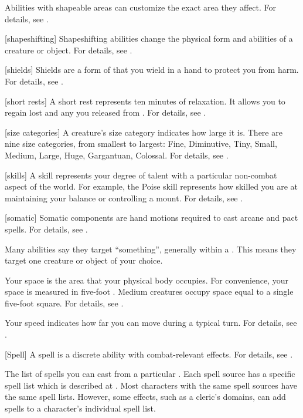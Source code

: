  Abilities with shapeable areas can customize the exact area they affect.
For details, see .

[shapeshifting] Shapeshifting abilities change the physical form and abilities of a creature or object.
For details, see .

[shields] Shields are a form of  that you wield in a hand to protect you from harm.
For details, see .

[short rests] A short rest represents ten minutes of relaxation.
It allows you to regain lost  and any  you released from .
For details, see .

[size categories] A creature's size category indicates how large it is.
There are nine size categories, from smallest to largest: Fine, Diminutive, Tiny, Small, Medium, Large, Huge, Gargantuan, Colossal.
For details, see .

[skills] A skill represents your degree of talent with a particular non-combat aspect of the world.
For example, the Poise skill represents how skilled you are at maintaining your balance or controlling a mount.
For details, see .

[somatic] Somatic components are hand motions required to cast arcane and pact spells.
For details, see .

 Many abilities say they target ``something'', generally within a .
This means they target one creature or object of your choice.

 Your space is the area that your physical body occupies.
For convenience, your space is measured in five-foot .
Medium creatures occupy space equal to a single five-foot square.
For details, see .

 Your speed indicates how far you can move during a typical turn.
For details, see .

[Spell] A spell is a discrete \magical ability with combat-relevant effects.
For details, see .

 The list of spells you can cast from a particular .
Each spell source has a specific spell list which is described at .
Most characters with the same spell sources have the same spell lists.
However, some effects, such as a cleric's domains, can add spells to a character's individual spell list.


